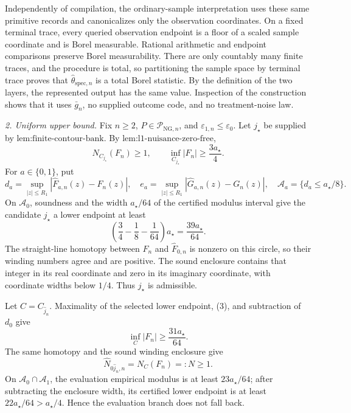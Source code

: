 Independently of compilation, the ordinary-sample interpretation uses these
same primitive records and canonicalizes only the observation coordinates.
On a fixed terminal trace, every queried observation endpoint is a floor of
a scaled sample coordinate and is Borel measurable.  Rational arithmetic
and endpoint comparisons preserve Borel measurability.  There are only
countably many finite traces, and the procedure is total, so partitioning the
sample space by terminal trace proves that
\(\widehat\theta_{\mathrm{spec},n}\) is a total Borel statistic.  By the
definition of the two layers, the represented output has the same value.
Inspection of the construction shows that it uses \(\bar g_n\), no supplied
outcome code, and no treatment-noise law.

\emph{2. Uniform upper bound.}
Fix \(n\ge2\), \(P\in\mathcal P_{\mathrm{NG},n}\), and
\(\varepsilon_{1,n}\le\varepsilon_0\).  Let \(j_{\star}\) be supplied by
\(\text{lem:finite-contour-bank}\).  By
\(\text{lem:l1-nuisance-zero-free}\),
\[
 N_{C_{j_{\star}}}(F_n)\ge1,
 \qquad
 \inf_{C_{j_{\star}}}|F_n|\ge\frac{3a_{\star}}4.                 \tag{2}
\]
For \(a\in\{0,1\}\), put
\[
 d_a=\sup_{|z|\le R_1}|\widehat F_{a,n}(z)-F_n(z)|,
 \quad
 e_a=\sup_{|z|\le R_1}|\widehat G_{a,n}(z)-G_n(z)|,
 \quad
 \mathcal A_a=\{d_a\le a_{\star}/8\}.
\]
On \(\mathcal A_0\), soundness and the width
\(a_{\star}/64\) of the certified modulus interval give the candidate
\(j_{\star}\) a lower endpoint at least
\[
 \left(\frac34-\frac18-\frac1{64}\right)a_{\star}
 =\frac{39a_{\star}}{64}.                                        \tag{3}
\]
The straight-line homotopy between \(F_n\) and
\(\widehat F_{0,n}\) is nonzero on this circle, so their winding numbers
agree and are positive.  The sound enclosure contains that integer in its
real coordinate and zero in its imaginary coordinate, with coordinate
widths below \(1/4\).  Thus \(j_{\star}\) is admissible.

Let \(C=C_{\widehat j_n}\).  Maximality of the selected lower endpoint,
(3), and subtraction of \(d_0\) give
\[
 \inf_C|F_n|\ge\frac{31a_{\star}}{64}.                            \tag{4}
\]
The same homotopy and the sound winding enclosure give
\[
 \widehat N_{0\widehat j_n,n}=N_C(F_n)=:N\ge1.                   \tag{5}
\]
On \(\mathcal A_0\cap\mathcal A_1\), the evaluation empirical modulus is
at least \(23a_{\star}/64\); after subtracting the enclosure width, its
certified lower endpoint is at least \(22a_{\star}/64>a_{\star}/4\).
Hence the evaluation branch does not fall back.

